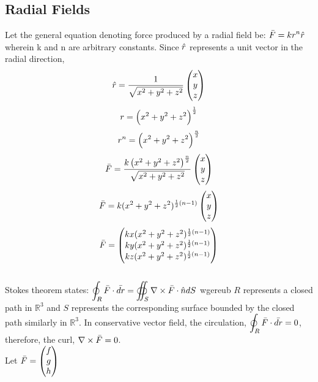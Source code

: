 \documentclass[a4paper, 12pt]{report}
\begin{document}
\begin{center}
\chapter{Radial Fields}
\begin{comment}
\end{comment}
\begin{comment}
\end{comment}
Let the general equation denoting force produced by a radial field be: $\displaystyle{\bar{F} = kr^n\hat{r}}$ wherein k and n are arbitrary constants. Since $\displaystyle{\hat{r}}$ represents a unit vector in the radial direction, 
$$\hat{r} = \frac{1}{\sqrt{x^2 + y^2 + z^2}}\begin{pmatrix}x \\ y \\ z \end{pmatrix}$$
$$r = \left(x^2 +y ^2 + z^2\right)^\frac{1}{2}$$
$$r^n = \left(x^2 +y ^2 + z^2\right)^\frac{n}{2}$$
$$\bar{F} = \frac{k\left(x^2 +y ^2 + z^2\right)^\frac{n}{2}}{\sqrt{x^2 + y^2 + z^2}}\begin{pmatrix} x\\y\\z \end{pmatrix}$$
$$\bar{F} = k(x^2 + y^2 + z^2)^{\frac{1}{2}(n-1)}\begin{pmatrix} x\\y\\z \end{pmatrix}$$
$$\bar{F} = \begin{pmatrix} kx(x^2 + y^2 + z^2)^{\frac{1}{2}(n-1)}\\ky(x^2 + y^2 + z^2)^{\frac{1}{2}(n-1)}\\kz(x^2 + y^2 + z^2)^{\frac{1}{2}(n-1)} \end{pmatrix}$$
\\Stokes theorem states: $\displaystyle{\oint_R  \bar{F} \cdot \bar{dr} = \oiint_S \nabla \times \bar{F} \cdot \hat{n}dS}$ wgereub $R$ represents a closed path in $\mathbb{R}^3$ and $S$ represents the corresponding surface bounded by the closed path similarly in $\mathbb{R}^3$. In  conservative vector field, the circulation, $\displaystyle{\oint_R  \bar{F} \cdot \bar{dr}} = 0$, therefore, the curl, $\nabla \times \bar{F} = 0$.
\\Let $\displaystyle{\bar{F} = \begin{pmatrix} f\\g\\h \end{pmatrix}}$

\end{center}
\end{document}
